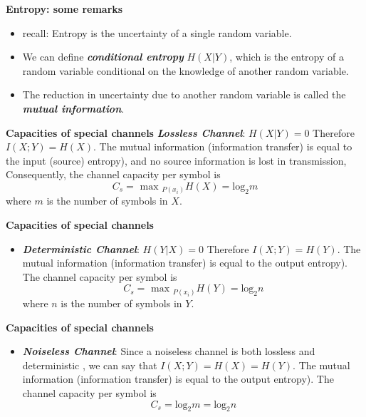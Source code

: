 


{
\noindent \textbf{Entropy: some remarks}
\begin{itemize}
\item recall: Entropy is the uncertainty of a single random variable. \item We can define \textbf{\emph{conditional entropy }}$H(X|Y)$, which is the entropy of a random variable
conditional on the knowledge of another random variable. \item The reduction in uncertainty due to another random variable is called the \textbf{\emph{mutual information}}.
\end{itemize}
}




\noindent \textbf{Capacities of special channels}
\textbf{\emph{Lossless Channel}}:  $H(X|Y) = 0$ Therefore $I(X;Y) = H(X)$.
The mutual information (information transfer) is equal to the input (source) entropy), and no source information is lost in transmission, Consequently, the channel capacity per symbol is
\[ C_s = \mbox{ max }_{P(x_i)} H(X) = \mbox{log}_2m \]
where $m$ is the number of symbols in $X$.




\noindent \textbf{Capacities of special channels}
\begin{itemize}
\item \textbf{\emph{Deterministic Channel}}:  $H(Y|X) = 0$ Therefore $I(X;Y) = H(Y)$.
The mutual information (information transfer) is equal to the output entropy). The channel capacity per symbol is
\[ C_s = \mbox{ max }_{P(x_i)} H(Y) = \mbox{log}_2n \]
where $n$ is the number of symbols in $Y$.
\end{itemize}


\noindent \textbf{Capacities of special channels}
\begin{itemize}
\item \textbf{\emph{Noiseless Channel}}:  Since a noiseless channel is both lossless and deterministic , we can say that $I(X;Y) = H(X) = H(Y)$.
The mutual information (information transfer) is equal to the output entropy). The channel capacity per symbol is
\[ C_s = \mbox{log}_2m = \mbox{log}_2n \]
\end{itemize}



